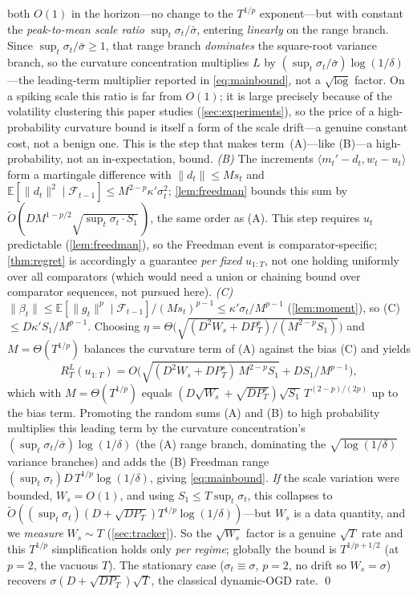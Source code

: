 \documentclass{article}
\newcommand{\E}{\mathbb{E}}
\newcommand{\ip}[2]{\langle #1, #2 \rangle}
\newcommand{\norm}[1]{\lVert #1 \rVert}
\newcommand{\gt}{g_t}
\begin{document}
both $O(1)$ in the horizon---no change to the $T^{1/p}$ exponent---but with constant the
\emph{peak-to-mean scale ratio} $\sup_t\sigma_t/\bar\sigma$, entering \emph{linearly} on the
range branch. Since $\sup_t\sigma_t/\bar\sigma\ge1$, that range branch \emph{dominates} the
square-root variance branch, so the curvature concentration multiplies $L$ by
$(\sup_t\sigma_t/\bar\sigma)\log(1/\delta)$---the leading-term multiplier reported in
\eqref{eq:mainbound}, not a $\sqrt{\log}$ factor. On a spiking scale this ratio is far from
$O(1)$; it is large precisely because of the volatility clustering this paper studies
(\cref{sec:experiments}), so the price of a high-probability curvature bound is itself a form
of the scale drift---a genuine constant cost, not a benign one. This is the step that makes
term~(A)---like (B)---a high-probability, not an in-expectation, bound.
\emph{(B)} The increments $\ip{m_t'-d_t}{w_t-u_t}$ form a martingale difference with
$\norm{d_t}\le Ms_t$ and $\E[\norm{d_t}^2\mid\mathcal F_{t-1}]\le M^{2-p}\kappa'
\sigma_t^2$; \cref{lem:freedman} bounds this sum by
$\tilde O(D M^{1-p/2}\sqrt{\sup_t\sigma_t\cdot S_1}\,)$, the same order as (A). This step
requires $u_t$ predictable (\cref{lem:freedman}), so the Freedman event is
comparator-specific; \cref{thm:regret} is accordingly a guarantee \emph{per fixed}
$u_{1:T}$, not one holding uniformly over all comparators (which would need a union or
chaining bound over comparator sequences, not pursued here).
\emph{(C)} $\norm{\beta_t}\le\E[\norm{\gt}^p\mid\mathcal F_{t-1}]/(Ms_t)^{p-1}\le
\kappa'\sigma_t/M^{p-1}$ (\cref{lem:moment}), so (C) $\le D\kappa'S_1/M^{p-1}$.
Choosing $\eta=\Theta\bigl(\sqrt{(D^2W_s+D P_T^s)/(M^{2-p}S_1)}\bigr)$ and
$M=\Theta(T^{1/p})$ balances the curvature term of (A) against the bias (C) and yields
\begin{equation*}
R_T^L(u_{1:T})=O\bigl(\sqrt{(D^2W_s+D P_T^s)\,M^{2-p}S_1}+D S_1/M^{p-1}\bigr),
\end{equation*}
which with $M=\Theta(T^{1/p})$ equals $(D\sqrt{W_s}+\sqrt{D P_T^s})\sqrt{S_1}\,
T^{(2-p)/(2p)}$ up to the bias term. Promoting the random sums (A) and (B) to high probability
multiplies this leading term by the curvature concentration's
$(\sup_t\sigma_t/\bar\sigma)\log(1/\delta)$ (the (A) range branch, dominating the
$\sqrt{\log(1/\delta)}$ variance branches) and adds the (B) Freedman range
$(\sup_t\sigma_t)D\,T^{1/p}\log(1/\delta)$, giving \eqref{eq:mainbound}. \emph{If} the scale
variation were bounded,
$W_s=O(1)$, and using $S_1\le T\sup_t\sigma_t$, this collapses to
$\tilde O((\sup_t\sigma_t)(D+\sqrt{D P_T})T^{1/p}\log(1/\delta))$---but $W_s$ is a data
quantity, and we \emph{measure} $W_s\sim T$ (\cref{sec:tracker}). So the $\sqrt{W_s}$
factor is a genuine $\sqrt T$ rate and this $T^{1/p}$ simplification holds only \emph{per
regime}; globally the bound is $T^{1/p+1/2}$ (at $p=2$, the vacuous $T$). The stationary
case ($\sigma_t\equiv\sigma$, $p=2$, no drift so $W_s=\sigma$) recovers
$\sigma(D+\sqrt{DP_T})\sqrt T$, the classical dynamic-OGD rate. \qed
\end{document}
